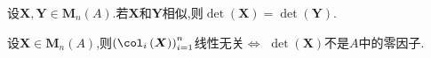 \begin{corollary}{}{}
	设$\boldsymbol{X},\boldsymbol{Y}\in\mathbf{M}_{n}\left(A\right)$.若$\boldsymbol{X}$和$\boldsymbol{Y}$相似,则$\det\left(\boldsymbol{X}\right)=\det\left(\boldsymbol{Y}\right)$.
\end{corollary}

\begin{proposition}{}{}
	设$\boldsymbol{X}\in\mathbf{M}_{n}\left(A\right)$,则$\left(\col_{i}\left(\boldsymbol{X}\right)\right)_{i=1}^{n}$线性无关$\iff$ $\det\left(\boldsymbol{X}\right)$不是$A$中的零因子.
\end{proposition}




















